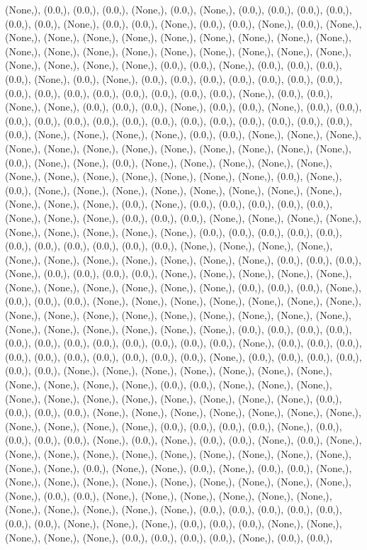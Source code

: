 \documentclass{article}
\begin{document}
(None,), (0.0,), (0.0,), (0.0,), (None,), (0.0,), (None,), (0.0,), (0.0,), (0.0,), (0.0,), (0.0,), (0.0,), (None,), (0.0,), (0.0,), (None,), (0.0,), (0.0,), (None,), (0.0,), (None,), (None,), (None,), (None,), (None,), (None,), (None,), (None,), (None,), (None,), (None,), (None,), (None,), (None,), (None,), (None,), (None,), (None,), (None,), (None,), (None,), (None,), (None,), (0.0,), (0.0,), (None,), (0.0,), (0.0,), (0.0,), (0.0,), (None,), (0.0,), (None,), (0.0,), (0.0,), (0.0,), (0.0,), (0.0,), (0.0,), (0.0,), (0.0,), (0.0,), (0.0,), (0.0,), (0.0,), (0.0,), (0.0,), (0.0,), (None,), (0.0,), (0.0,), (None,), (None,), (0.0,), (0.0,), (0.0,), (None,), (0.0,), (0.0,), (None,), (0.0,), (0.0,), (0.0,), (0.0,), (0.0,), (0.0,), (0.0,), (0.0,), (0.0,), (0.0,), (0.0,), (0.0,), (0.0,), (0.0,), (0.0,), (None,), (None,), (None,), (None,), (0.0,), (0.0,), (None,), (None,), (None,), (None,), (None,), (None,), (None,), (None,), (None,), (None,), (None,), (None,), (0.0,), (None,), (None,), (0.0,), (None,), (None,), (None,), (None,), (None,), (None,), (None,), (None,), (None,), (None,), (None,), (None,), (0.0,), (None,), (0.0,), (None,), (None,), (None,), (None,), (None,), (None,), (None,), (None,), (None,), (None,), (None,), (0.0,), (None,), (0.0,), (0.0,), (0.0,), (0.0,), (0.0,), (None,), (None,), (None,), (0.0,), (0.0,), (0.0,), (None,), (None,), (None,), (None,), (None,), (None,), (None,), (None,), (None,), (0.0,), (0.0,), (0.0,), (0.0,), (0.0,), (0.0,), (0.0,), (0.0,), (0.0,), (0.0,), (0.0,), (None,), (None,), (None,), (None,), (None,), (None,), (None,), (None,), (None,), (None,), (None,), (0.0,), (0.0,), (0.0,), (None,), (0.0,), (0.0,), (0.0,), (0.0,), (None,), (None,), (None,), (None,), (None,), (None,), (None,), (None,), (None,), (None,), (None,), (0.0,), (0.0,), (0.0,), (None,), (0.0,), (0.0,), (0.0,), (None,), (None,), (None,), (None,), (None,), (None,), (None,), (None,), (None,), (None,), (None,), (None,), (None,), (None,), (None,), (None,), (None,), (None,), (None,), (None,), (None,), (None,), (0.0,), (0.0,), (0.0,), (0.0,), (0.0,), (0.0,), (0.0,), (0.0,), (0.0,), (0.0,), (0.0,), (0.0,), (None,), (0.0,), (0.0,), (0.0,), (0.0,), (0.0,), (0.0,), (0.0,), (0.0,), (0.0,), (0.0,), (None,), (0.0,), (0.0,), (0.0,), (0.0,), (0.0,), (0.0,), (None,), (None,), (None,), (None,), (None,), (None,), (None,), (None,), (None,), (None,), (None,), (0.0,), (0.0,), (None,), (None,), (None,), (None,), (None,), (None,), (None,), (None,), (None,), (None,), (None,), (0.0,), (0.0,), (0.0,), (0.0,), (None,), (None,), (None,), (None,), (None,), (None,), (None,), (None,), (None,), (None,), (None,), (0.0,), (0.0,), (0.0,), (0.0,), (None,), (0.0,), (0.0,), (0.0,), (0.0,), (None,), (0.0,), (None,), (0.0,), (0.0,), (None,), (0.0,), (None,), (None,), (None,), (None,), (None,), (None,), (None,), (None,), (None,), (None,), (None,), (None,), (0.0,), (None,), (None,), (0.0,), (None,), (0.0,), (0.0,), (None,), (None,), (None,), (None,), (None,), (None,), (None,), (None,), (None,), (None,), (None,), (0.0,), (0.0,), (None,), (None,), (None,), (None,), (None,), (None,), (None,), (None,), (None,), (None,), (None,), (0.0,), (0.0,), (0.0,), (0.0,), (0.0,), (0.0,), (0.0,), (None,), (None,), (None,), (0.0,), (0.0,), (0.0,), (None,), (None,), (None,), (None,), (None,), (0.0,), (0.0,), (0.0,), (0.0,), (None,), (0.0,), (0.0,), 
\end{document}
